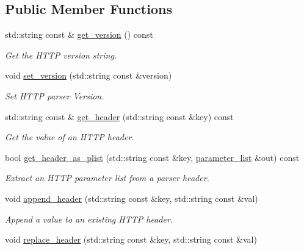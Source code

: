 \subsection*{Public Member Functions}
\begin{DoxyCompactItemize}
\item 
std\+::string const  \& \hyperlink{classwebsocketpp_1_1http_1_1parser_1_1parser_a6dbb56d657bca4ee492f3b07a579c341}{get\+\_\+version} () const
\begin{DoxyCompactList}\small\item\em Get the H\+T\+TP version string. \end{DoxyCompactList}\item 
void \hyperlink{classwebsocketpp_1_1http_1_1parser_1_1parser_a5c2e0e2bc0b2769db5a785b7d47a66ee}{set\+\_\+version} (std\+::string const \&version)
\begin{DoxyCompactList}\small\item\em Set H\+T\+TP parser Version. \end{DoxyCompactList}\item 
std\+::string const  \& \hyperlink{classwebsocketpp_1_1http_1_1parser_1_1parser_ae8a8f833c3fb01f1553a26e77f380367}{get\+\_\+header} (std\+::string const \&key) const
\begin{DoxyCompactList}\small\item\em Get the value of an H\+T\+TP header. \end{DoxyCompactList}\item 
bool \hyperlink{classwebsocketpp_1_1http_1_1parser_1_1parser_a42ab85c14bef2028d1e6f050af1140ce}{get\+\_\+header\+\_\+as\+\_\+plist} (std\+::string const \&key, \hyperlink{namespacewebsocketpp_1_1http_a2c285bc959df5a63bf962bed842fccfb}{parameter\+\_\+list} \&out) const
\begin{DoxyCompactList}\small\item\em Extract an H\+T\+TP parameter list from a parser header. \end{DoxyCompactList}\item 
void \hyperlink{classwebsocketpp_1_1http_1_1parser_1_1parser_abd39762de5ec467a29a537d79602b603}{append\+\_\+header} (std\+::string const \&key, std\+::string const \&val)
\begin{DoxyCompactList}\small\item\em Append a value to an existing H\+T\+TP header. \end{DoxyCompactList}\item 
void \hyperlink{classwebsocketpp_1_1http_1_1parser_1_1parser_aba2991b2aa41ca60d9427950502b0b93}{replace\+\_\+header} (std\+::string const \&key, std\+::string const \&val)

\end{DoxyCompactItemize}
